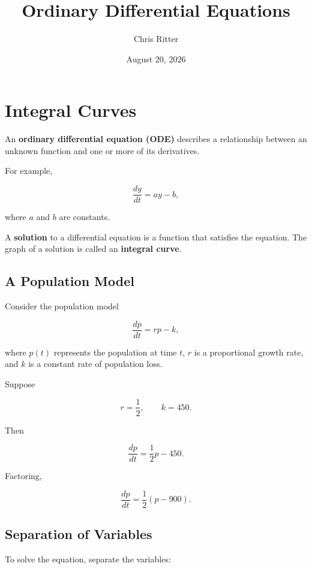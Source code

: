 \documentclass[11pt]{article}
\title{Ordinary Differential Equations}
\author{Chris Ritter}
\date{August 20, 2026}
\begin{document}
\maketitle
\tableofcontents
\newpage

\section{Integral Curves}

An \textbf{ordinary differential equation (ODE)} describes a
relationship between an unknown function and one or more of its
derivatives.

For example,

\[
\frac{dy}{dt}=ay-b,
\]

where $a$ and $b$ are constants.

A \textbf{solution} to a differential equation is a function that
satisfies the equation. The graph of a solution is called an
\textbf{integral curve}.

\subsection{A Population Model}

Consider the population model

\[
\frac{dp}{dt}=rp-k,
\]

where $p(t)$ represents the population at time $t$, $r$ is a
proportional growth rate, and $k$ is a constant rate of population
loss.

Suppose

\[
r=\frac{1}{2},
\qquad
k=450.
\]

Then

\[
\frac{dp}{dt}
=
\frac{1}{2}p-450.
\]

Factoring,

\[
\frac{dp}{dt}
=
\frac{1}{2}(p-900).
\]

\subsection{Separation of Variables}

To solve the equation, separate the variables:
\end{document}
